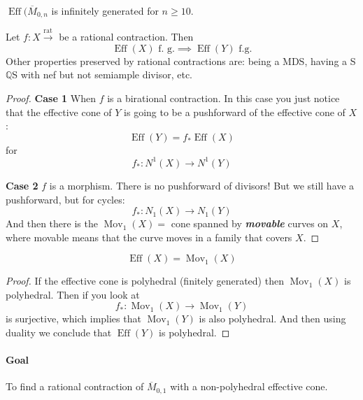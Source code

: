 \begin{thm}\leavevmode
	$\operatorname{E f f}(\overline{M}_{0,n}$ is infinitely generated for $n\geq 10$.
\end{thm}

\begin{lemma}
	Let $f:X\overset{\operatorname{rat}}{\longrightarrow}$ be a rational contraction. Then
	\[\operatorname{E f f}(X) \text{ f. g.} \implies \operatorname{E f f}(Y) \text{ f.g.}  \]
	Other properties preserved by rational contractions are: being a MDS, having a S$\mathbb{Q}$S with nef but not semiample divisor, etc.
\end{lemma}

\begin{proof}
	\textbf{Case 1} When $f$ is a birational contraction. In this case you just notice that the effective cone of $Y$ is going to be a pushforward of the effective cone of $X$ :
	\[\operatorname{E f f}(Y)=f_* \operatorname{E f f}(X)\]
	for
\[f_* :N^1(X)\to N^1(Y)\]

\textbf{Case 2}  $f$ is a morphism. There is no pushforward of divisors! But we still have a pushforward, but for cycles:
\[f_* :N_1(X)\to N_1(Y)\]
And then there is the $\operatorname{Mov}_1(X)=$ cone spanned by \textit{\textbf{movable}} curves on $X$, where movable means that the curve moves in a family that covers $X$.
\end{proof}

\begin{thm}\leavevmode
	\[\operatorname{E f f}(X)=\operatorname{Mov}_{1}(X)\]
\end{thm}
\begin{proof}
	If the effective cone is polyhedral (finitely generated) then $\operatorname{Mov}_{1}(X)$ is polyhedral. Then if you look at
	\[f_* :\operatorname{Mov}_1(X)\to \operatorname{Mov}_1(Y)\]
	is surjective, which implies that $\operatorname{Mov}_1(Y)$ is also polyhedral. And then using duality we conclude that $\operatorname{E f f}(Y)$ is polyhedral.
\end{proof}

\paragraph{Goal} To find a rational contraction of $\overline{M}_{0,1}$ with a non-polyhedral effective cone.

